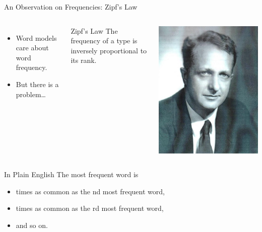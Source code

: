 \documentclass[professionalfonts, xcolor={usenames,svgnames,x11names,table}]{beamer}
\begin{document}
\begin{frame}{An Observation on Frequencies: Zipf's Law}
    \begin{columns}
        \begin{itemize}
            \item Word models care about word frequency.
            \item But there is a problem\ldots
        \end{itemize}
        \begin{alertblock}{Zipf's Law}
            The frequency of a type is inversely proportional to its rank.
        \end{alertblock}

        \includegraphics[width=.8\linewidth]{./img/george_zipf}
    \end{columns}

    \pause
    \begin{block}{In Plain English}
        The most frequent word is
            \begin{itemize}
                \item {} times as common as the nd most frequent word,
                \item {} times as common as the rd most frequent word,
                \item and so on.
            \end{itemize}
    \end{block}
\end{frame}
\end{document}
